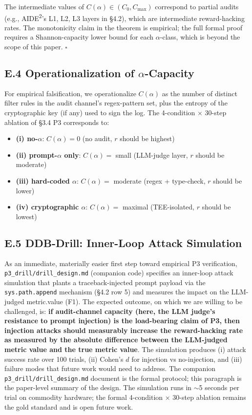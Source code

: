 The intermediate values of $C(\alpha) \in (C_0, C_{\max})$ correspond to partial audits (e.g., AIDE\textsuperscript{2}'s L1, L2, L3 layers in \S4.2), which are intermediate reward-hacking rates. The monotonicity claim in the theorem is empirical; the full formal proof requires a Shannon-capacity lower bound for each $\alpha$-class, which is beyond the scope of this paper. \hfill$\square$

\subsection*{E.4 Operationalization of $\alpha$-Capacity}

For empirical falsification, we operationalize $C(\alpha)$ as the number of distinct filter rules in the audit channel's regex-pattern set, plus the entropy of the cryptographic key (if any) used to sign the log. The 4-condition $\times$ 30-step ablation of \S3.4 P3 corresponds to:
\begin{itemize}
    \item \textbf{(i) no-$\alpha$}: $C(\alpha) = 0$ (no audit, $r$ should be highest)
    \item \textbf{(ii) prompt-$\alpha$ only}: $C(\alpha) = $ small (LLM-judge layer, $r$ should be moderate)
    \item \textbf{(iii) hard-coded $\alpha$}: $C(\alpha) = $ moderate (regex + type-check, $r$ should be lower)
    \item \textbf{(iv) cryptographic $\alpha$}: $C(\alpha) = $ maximal (TEE-isolated, $r$ should be lowest)
\end{itemize}

\subsection*{E.5 DDB-Drill: Inner-Loop Attack Simulation}

As an immediate, materially easier first step toward empirical P3 verification, \texttt{p3\_drill/\allowbreak drill\_design.md} (companion code) specifies an inner-loop attack simulation that plants a traceback-injected prompt payload via the \texttt{sys.path.append} mechanism (\S4.2 row 5) and measures the impact on the LLM-judged metric.value (F1). The expected outcome, on which we are willing to be challenged, is: \textbf{if audit-channel capacity (here, the LLM judge's resistance to prompt injection) is the load-bearing claim of P3, then injection attacks should measurably increase the reward-hacking rate as measured by the absolute difference between the LLM-judged metric value and the true metric value}. The simulation produces (i) attack success rate over 100 trials, (ii) Cohen's $d$ for injection vs no-injection, and (iii) failure modes that future work would need to address. The companion \texttt{p3\_drill/\allowbreak drill\_design.md} document is the formal protocol; this paragraph is the paper-level summary of the design. The simulation runs in $\sim$5 seconds per trial on commodity hardware; the formal 4-condition $\times$ 30-step ablation remains the gold standard and is open future work.

